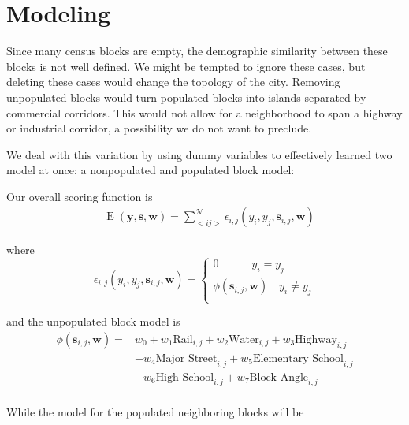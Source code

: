 \documentclass[12pt,letter]{article}\usepackage[]{graphicx}\usepackage[]{color}
\begin{document}
\section*{Modeling}
Since many census blocks are empty, the demographic similarity between
these blocks is not well defined. We might be tempted to ignore these
cases, but deleting these cases would change the topology of the
city. Removing unpopulated blocks would turn populated blocks into
islands separated by commercial corridors. This would not allow for a
neighborhood to span a highway or industrial corridor, a possibility
we do not want to preclude.

We deal with this variation by using dummy variables to effectively
learned two model at once: a nonpopulated and populated block model:

Our overall scoring function is 
\begin{align}
&\operatorname{E}(\mathbf{y}, \mathbf{s}, \mathbf{w}) = \sum_{<i
    j>}^{\mathcal{N}}\epsilon_{i,j}(y_i, y_j, \mathbf{s}_{i,j}, \mathbf{w})  
\end{align}

where 
\begin{equation}
\epsilon_{i,j}(y_i, y_j, \mathbf{s}_{i,j}, \mathbf{w}) = \begin{cases}
    0 \quad\quad\quad y_i = y_j \\
    \phi(\mathbf{s}_{i,j}, \mathbf{w}) \quad y_i \neq y_j \\
  \end{cases}
\end{equation}

and the unpopulated block model is 
\begin{align}
\phi(\mathbf{s}_{i,j}, \mathbf{w}) = & w_0 
                                     + w_1\text{Rail}_{i,j} 
                                     + w_2\text{Water}_{i,j} 
                                     + w_3\text{Highway}_{i,j} \\
                                     &+ w_4\text{Major Street}_{i,j} 
                                     + w_5\text{Elementary School}_{i,j}\\ 
                                     & + w_6\text{High School}_{i,j}
                                     + w_7\text{Block Angle}_{i,j} \\
\end{align}

While the model for the populated neighboring blocks will be
\end{document}
